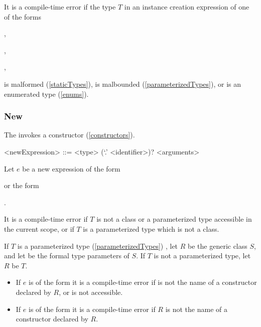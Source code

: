 \documentclass[makeidx]{article}
\begin{document}
\LMHash{}%
It is a compile-time error if
the type $T$ in an instance creation expression of one of the forms

,

,

,


\noindent
is malformed (\ref{staticTypes}),
is malbounded (\ref{parameterizedTypes}),
or is an enumerated type (\ref{enums}).


\subsubsection{New}

\LMHash{}%
The  invokes a constructor (\ref{constructors}).

\begin{grammar}
<newExpression> ::= \NEW{} <type> (`.' <identifier>)? <arguments>
\end{grammar}

\LMHash{}%
Let $e$ be a new expression of the form

or the form

.

\LMHash{}%
It is a compile-time error if $T$ is not
a class or a parameterized type accessible in the current scope,
or if $T$ is a parameterized type which is not a class.

\LMHash{}%
If $T$ is a parameterized type (\ref{parameterizedTypes})
,
let $R$ be the generic class $S$,
and let
be the formal type parameters of $S$.
If $T$ is not a parameterized type, let $R$ be $T$.

\begin{itemize}
\item
  If $e$ is of the form
  it is a compile-time error if  is not the name of
  a constructor declared by $R$, or \id{} is not accessible.
\item
  If $e$ is of the form
  it is a compile-time error if $R$ is not the name of
  a constructor declared by $R$.
\end{itemize}
\end{document}
